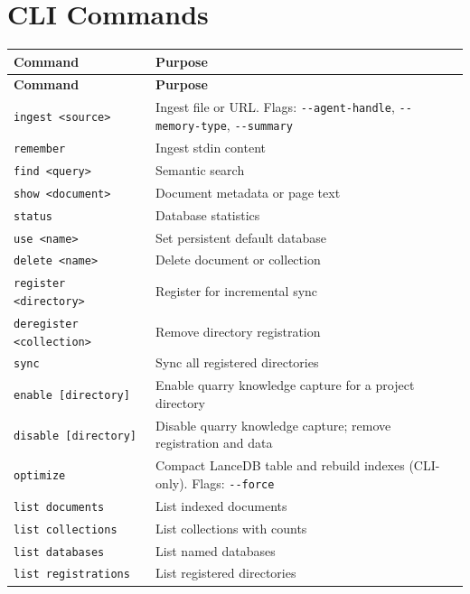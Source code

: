 \documentclass[a4paper,10pt]{article}
\begin{document}
\section{CLI Commands}

\begin{center}
\begin{longtable}{lp{8cm}}
\toprule
\textbf{Command} & \textbf{Purpose} \\
\midrule
\endfirsthead
\toprule
\textbf{Command} & \textbf{Purpose} \\
\midrule
\endhead
\texttt{ingest <source>}      & Ingest file or URL.  Flags: \texttt{-{}-agent-handle},
  \texttt{-{}-memory-type}, \texttt{-{}-summary} \\
\texttt{remember}             & Ingest stdin content \\
\texttt{find <query>}         & Semantic search \\
\texttt{show <document>}      & Document metadata or page text \\
\texttt{status}               & Database statistics \\
\texttt{use <name>}           & Set persistent default database \\
\texttt{delete <name>}        & Delete document or collection \\
\texttt{register <directory>} & Register for incremental sync \\
\texttt{deregister <collection>} & Remove directory registration \\
\texttt{sync}                 & Sync all registered directories \\
\texttt{enable [directory]}   & Enable quarry knowledge capture for a project directory \\
\texttt{disable [directory]}  & Disable quarry knowledge capture; remove registration and data \\
\texttt{optimize}             & Compact LanceDB table and rebuild indexes (CLI-only).
  Flags: \texttt{-{}-force} \\
\texttt{list documents}       & List indexed documents \\
\texttt{list collections}     & List collections with counts \\
\texttt{list databases}       & List named databases \\
\texttt{list registrations}   & List registered directories \\

\end{longtable}
\end{center}
\end{document}
